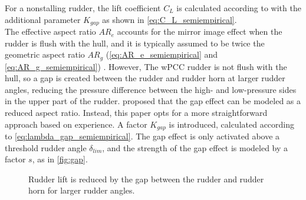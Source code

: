 For a nonstalling rudder, the lift coefficient $C_L$ is calculated according to \textcite{whickerFreeStreamCharacteristicsFamily1958} with the additional parameter $K_{gap}$ as shown in \autoref{eq:C_L_semiempirical}.
\begin{equation}
    \label{eq:C_L_semiempirical}
    
\end{equation}
%
\begin{equation}
    \label{eq:alpha_semiempirical}
    
\end{equation}
The effective aspect ratio $AR_e$ accounts for the mirror image effect when the rudder is flush with the hull, and it is typically assumed to be twice the geometric aspect ratio $AR_g$ (\autoref{eq:AR_e_semiempirical} and \autoref{eq:AR_g_semiempirical}) \cite{hughesTEMPESTLevel0Theory2011}.
However, The wPCC rudder is not flush with the hull, so a gap is created between the rudder and rudder horn at larger rudder angles, reducing the pressure difference between the high- and low-pressure sides in the upper part of the rudder. \textcite{matusiakDynamicsRigidShip2021} proposed that the gap effect can be modeled as a reduced aspect ratio. Instead, this paper opts for a more straightforward approach based on experience. A factor $K_{gap}$ is introduced, calculated according to \autoref{eq:lambda_gap_semiempirical}. The gap effect is only activated above a threshold rudder angle $\delta_{lim}$, and the strength of the gap effect is modeled by a factor $s$, as in \autoref{fig:gap}.
%
\begin{equation}
    \label{eq:AR_g_semiempirical}
    
\end{equation}
%
\begin{equation}
    \label{eq:AR_e_semiempirical}
    
\end{equation}
%
\begin{equation}
    \label{eq:lambda_gap_semiempirical}
    
\end{equation}
\begin{figure}[h]
    \centering
    
    \caption{Rudder lift is reduced by the gap between the rudder and rudder horn for larger rudder angles.}
    \label{fig:gap}
\end{figure}
\FloatBarrier

